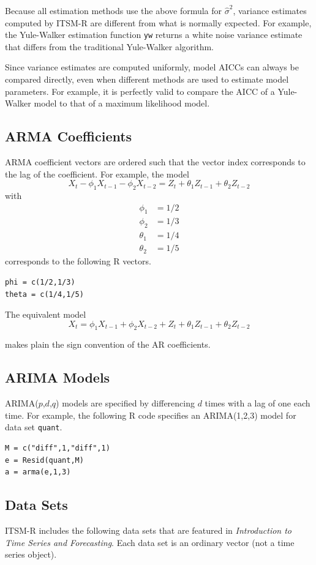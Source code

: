 \documentclass[12pt]{article}
\begin{document}
Because all estimation methods use the above formula for $\hat\sigma^2$,
variance estimates computed by ITSM-R are different from what is normally
expected.
For example, the Yule-Walker estimation function {\tt yw} returns a white noise
variance estimate that differs from the traditional Yule-Walker algorithm.

\bigskip
Since variance estimates are computed uniformly,
model AICCs can always be compared directly,
even when different methods are used to estimate model parameters.
For example, it is perfectly valid to compare the AICC of a Yule-Walker
model to that of a maximum likelihood model.

\subsection{ARMA Coefficients}
ARMA coefficient vectors are ordered such that
the vector index corresponds to the lag of the coefficient.
For example, the model
\[
X_t-\phi_1X_{t-1}-\phi_2X_{t-2}=Z_t+\theta_1Z_{t-1}+\theta_2Z_{t-2}
\]
with
\begin{align*}
\phi_1&=1/2\\
\phi_2&=1/3\\
\theta_1&=1/4\\
\theta_2&=1/5
\end{align*}
corresponds to the following R vectors.

\begin{verbatim}
phi = c(1/2,1/3)
theta = c(1/4,1/5)
\end{verbatim}

The equivalent model
\[
X_t=\phi_1X_{t-1}+\phi_2X_{t-2}
+Z_t+\theta_1Z_{t-1}+\theta_2Z_{t-2}
\]

makes plain the sign convention of the AR coefficients.

\subsection{ARIMA Models}
ARIMA($p$,$d$,$q$)
models are specified by differencing $d$ times with a lag of one each time.
For example, the following R code specifies an ARIMA(1,2,3) model
for data set {\tt quant}.

\begin{verbatim}
M = c("diff",1,"diff",1)
e = Resid(quant,M)
a = arma(e,1,3)
\end{verbatim}

\subsection{Data Sets}
ITSM-R includes the following data sets that are featured in
{\it Introduction to Time Series and Forecasting}.
Each data set is an ordinary vector (not a time series object).
\end{document}

